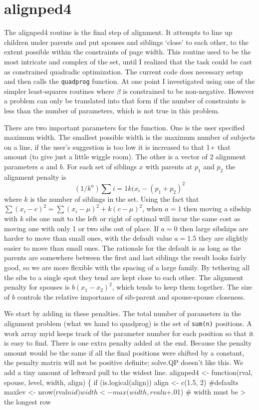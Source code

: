 \documentclass{article}
\begin{document}
\section{alignped4}
The alignped4 routine is the final step of alignment.  It attempts to line
up children under parents and put spouses and siblings `close' to each other, 
to the extent possible within the constraints of page width.  This routine
used to be the most intricate and complex of the set, until I realized that
the task could be cast as constrained quadradic optimization.
The current code does necessary setup and then calls the {\tt{}quadprog}
function.  
At one point I investigated using one of the simpler least-squares routines
where $\beta$ is constrained to be non-negative. 
However a problem can only be translated into that form if the number
of constraints is less than the number of parameters, which is not
true in this problem.

There are two important parameters for the function.  One is the user specified
maximum width.  The smallest possible width is the maximum number of subjects
on a line, if the user's suggestion is too low it is increased to that 1+ that
amount (to give just a little wiggle room).
The other is a vector of 2 alignment parameters $a$ and $b$.
For each set of siblings ${x}$ with parents at $p_1$ and $p_2$ the
alignment penalty is
$$
   (1/k^a)\sum{i=1}{k} (x_i - (p_1 + p_2)^2
$$
where $k$ is the number of siblings in the set.
Using the fact that $\sum(x_i-c)^2 = \sum(x_i-\mu)^2 + k(c-\mu)^2$,
when $a=1$ then moving a sibship with $k$ sibs one unit to the left or
right of optimal will incur the same cost as moving one with only 1 or
two sibs out of place.  If $a=0$ then large sibships are harder to move
than small ones, with the default value $a=1.5$ they are slightly easier 
to move than small ones.  The rationale for the default is as long as the
parents are somewhere between the first and last siblings the result looks
fairly good, so we are more flexible with the spacing of a large family.
By tethering all the sibs to a single spot they tend are kept close to 
each other.
The alignment penalty for spouses is $b(x_1 - x_2)^2$, which tends to keep 
them together.  The size of $b$ controls the relative importance of sib-parent
and spouse-spouse closeness.

We start by adding in these penalties.  The total number of parameters
in the alignment problem (what we hand to quadprog) is the set 
of {\tt{}sum(n)} positions.  A work array myid keeps track of the parameter
number for each position so that it is easy to find.
There is one extra penalty added at the end.  Because the penalty amount
would be the same if all the final positions were shifted by a constant,
the penalty matrix will not be positive definite; solve.QP doesn't like
this.  We add a tiny amount of leftward pull to the widest line.
\nwenddocs{}\endmoddef
alignped4 <- function(rval, spouse, level, width, align) \{
    if (is.logical(align)) align <- c(1.5, 2)  #defaults
    maxlev <- nrow(rval$nid)
    width <- max(width, rval$n+.01)   # width must be > the longest row
\end{document}
